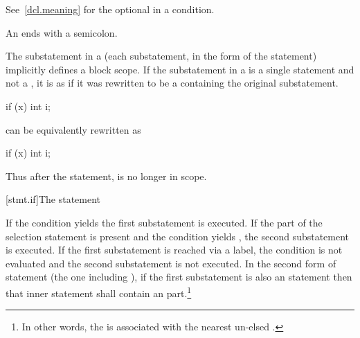See~\ref{dcl.meaning} for the optional  in a condition.
\begin{note}
An  ends with a semicolon.
\end{note}

\pnum
{}%
The substatement in a  (each substatement,
in the  form of the  statement) implicitly defines
a block scope. If the substatement in a
 is a single statement and not a
, it is as if it was rewritten to be a
 containing the original substatement.
\begin{example}
\begin{codeblock}
if (x)
  int i;
\end{codeblock}

can be equivalently rewritten as

\begin{codeblock}
if (x) {
  int i;
}
\end{codeblock}

Thus after the  statement,  is no longer in scope.
\end{example}

[stmt.if]{The  statement}%

\pnum
If the condition yields  the first
substatement is executed. If the  part of the selection
statement is present and the condition yields , the second
substatement is executed. If the first substatement is reached via a
label, the condition is not evaluated and the second substatement is
not executed. In the second form of  statement
(the one including ), if the first substatement is also an
 statement then that inner  statement shall contain
an  part.\footnote{In other words, the  is associated with the nearest un-elsed
.}

